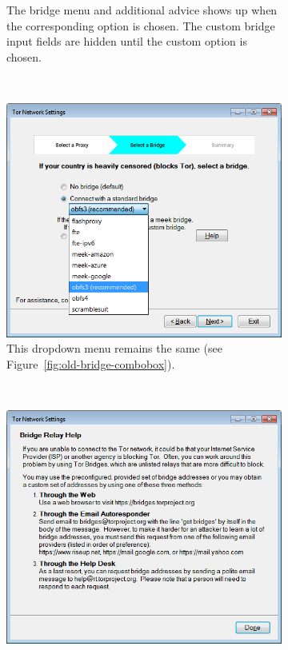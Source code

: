 \documentclass[USenglish,oneside,twocolumn]{article}
\begin{document}
\begin{figure}
\begin{subfigure}[b]{0.30\textwidth}
	\centering\captionsetup{width=1.5\linewidth}%
	\caption{The bridge menu and additional advice shows up when the corresponding option is chosen. The custom bridge input fields are hidden until the custom option is chosen.}
	\label{fig:new-bridge}
\end{subfigure}
~~~~~~~~~~
\begin{subfigure}[b]{0.30\textwidth}
	\includegraphics[width=\textwidth]{screenshots/NEW-bridgeSettings-combobox.png}
	\centering\captionsetup{width=1.5\linewidth}%
	\caption{This dropdown menu remains the same (see Figure~\ref{fig:old-bridge-combobox}).}
	\label{fig:new-bridge-combobox}
\end{subfigure}
~~~~~~~~~~~~~~~~~~~~~~~~~
\begin{subfigure}[b]{0.30\textwidth}
	\includegraphics[width=\textwidth]{screenshots/NEW-bridgeHelp.png}

\end{subfigure}
\end{figure}
\end{document}
